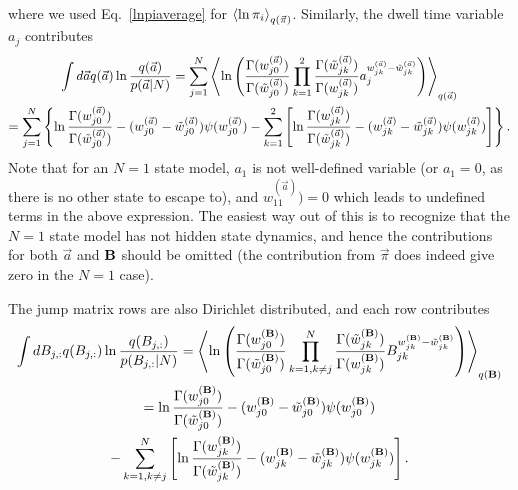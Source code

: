 where we used Eq.~\eqref{lnpiaverage} for
$\left\langle \ln \pi_i\right\rangle_{q(\vec{\pi})}$. Similarly, the dwell time variable
$a_j$ contributes
\begin{multline}
  \int d\vec{ a} q(\vec{ a}) \ln\frac{q(\vec{ a})}{p(\vec{ a}|N)}
  =\sum_{j=1}^N
  \left\langle \ln\left(\frac{\Gamma(w_{j0}^{(\vec{ a})})}{\Gamma(\tilde w_{j0}^{(\vec{ a})})}
    \prod_{k=1}^2\frac{\Gamma(\tilde w_{jk}^{(\vec{ a})})}{\Gamma(w_{jk}^{(\vec{ a})})}
     a_j^{w_{jk}^{(\vec{ a})}-\tilde w_{jk}^{(\vec{ a})}}\right)\right\rangle_{q(\vec{ a})}\\
  =\sum_{j=1}^N\left\{
  \ln\frac{\Gamma(w_{j0}^{(\vec{ a})})}{\Gamma(\tilde w_{j0}^{(\vec{ a})})}
  -(w_{j0}^{(\vec a)}-\tilde w_{j0}^{(\vec a)})\psi(w_{j0}^{(\vec{ a})})
  -\sum_{k=1}^2\left[\ln\frac{\Gamma(w_{jk}^{(\vec{ a})})}{\Gamma(\tilde w_{jk}^{(\vec{ a})})}
    -(w_{jk}^{(\vec{ a})}-\tilde w_{jk}^{(\vec{ a})})\psi(w_{jk}^{(\vec{ a})})\right]\right\}.
\end{multline}
Note that for an $N=1$ state model, $a_1$ is not well-defined variable
(or $a_1=0$, as there is no other state to escape to), and
$w_{11}^{(\vec{ a})})=0$ which leads to undefined terms in the above
expression. The easiest way out of this is to recognize that the $N=1$
state model has not hidden state dynamics, and hence the contributions
for both $\vec{a}$ and $\mathbf{B}$ should be omitted (the
contribution from $\vec{\pi}$ does indeed give zero in the $N=1$
case).

The jump matrix rows are also Dirichlet distributed, and each row
contributes
\begin{multline}
  \int dB_{j,:} q(B_{j,:}) \ln\frac{q(B_{j,:})}{p(B_{j,:}|N)}
  =\left\langle \ln\left(\frac{\Gamma(w_{j0}^{(\mathbf{B})})}{\Gamma(\tilde w_{j0}^{(\mathbf{B})})}
    \prod_{k=1,k\ne j}^N\frac{\Gamma(\tilde w_{jk}^{(\mathbf{B})})}{\Gamma(w_{jk}^{(\mathbf{B})})}
    B_{jk}^{w_{jk}^{(\mathbf{B})}-\tilde w_{jk}^{(\mathbf{B})}}\right)\right\rangle_{q(\mathbf{B})}\\
  =\ln\frac{\Gamma(w_{j0}^{(\mathbf{B})})}{\Gamma(\tilde w_{j0}^{(\mathbf{B})})}
  -(w_{j0}^{(\mathbf{B})}-\tilde w_{j0}^{(\mathbf{B})})\psi(w_{j0}^{(\mathbf{B})})\\
  -\sum_{k=1,k\ne j}^N\left[\ln\frac{\Gamma(w_{jk}^{(\mathbf{B})})}{\Gamma(\tilde w_{jk}^{(\mathbf{B})})}
    -(w_{jk}^{(\mathbf{B})}-\tilde w_{jk}^{(\mathbf{B})})\psi(w_{jk}^{(\mathbf{B})})
\right].
\end{multline}

